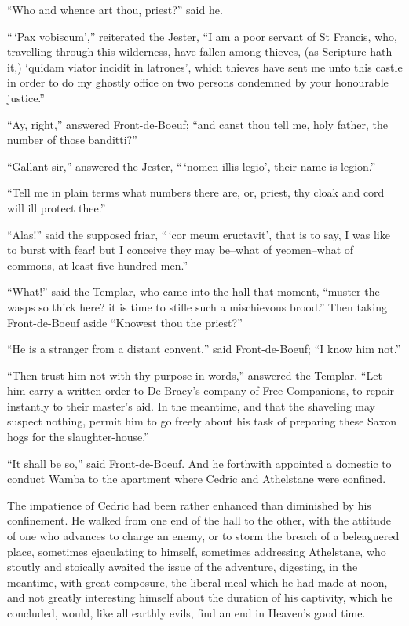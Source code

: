 ``Who and whence art thou, priest?'' said he.

``\,`Pax vobiscum','' reiterated the Jester, ``I am a poor servant of St
Francis, who, travelling through this wilderness, have fallen among
thieves, (as Scripture hath it,) `quidam viator incidit in latrones',
which thieves have sent me unto this castle in order to do my ghostly
office on two persons condemned by your honourable justice.''

``Ay, right,'' answered Front-de-Boeuf; ``and canst thou tell me, holy
father, the number of those banditti?''

``Gallant sir,'' answered the Jester, ``\,`nomen illis legio', their
name is legion.''

``Tell me in plain terms what numbers there are, or, priest, thy cloak
and cord will ill protect thee.''

``Alas!'' said the supposed friar, ``\,`cor meum eructavit', that is to
say, I was like to burst with fear! but I conceive they may be--what of
yeomen--what of commons, at least five hundred men.''

``What!'' said the Templar, who came into the hall that moment, ``muster
the wasps so thick here? it is time to stifle such a mischievous
brood.'' Then taking Front-de-Boeuf aside ``Knowest thou the priest?''

``He is a stranger from a distant convent,'' said Front-de-Boeuf; ``I
know him not.''

``Then trust him not with thy purpose in words,'' answered the Templar.
``Let him carry a written order to De Bracy's company of Free
Companions, to repair instantly to their master's aid. In the meantime,
and that the shaveling may suspect nothing, permit him to go freely
about his task of preparing these Saxon hogs for the slaughter-house.''

``It shall be so,'' said Front-de-Boeuf. And he forthwith appointed a
domestic to conduct Wamba to the apartment where Cedric and Athelstane
were confined.

The impatience of Cedric had been rather enhanced than diminished by his
confinement. He walked from one end of the hall to the other, with the
attitude of one who advances to charge an enemy, or to storm the breach
of a beleaguered place, sometimes ejaculating to himself, sometimes
addressing Athelstane, who stoutly and stoically awaited the issue of
the adventure, digesting, in the meantime, with great composure, the
liberal meal which he had made at noon, and not greatly interesting
himself about the duration of his captivity, which he concluded, would,
like all earthly evils, find an end in Heaven's good time.


